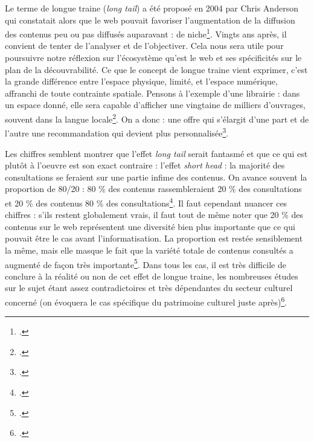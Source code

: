 Le terme de longue traine (\textit{long tail}) a été proposé en 2004 par Chris Anderson qui constatait alors que le web pouvait favoriser l’augmentation de la diffusion des contenus peu ou pas diffusés auparavant : de niche\footcite[§ 8]{benghozi_longue_2008}. Vingts ans après, il convient de tenter de l’analyser et de l’objectiver. Cela nous sera utile pour poursuivre notre réflexion sur l’écosystème qu’est le web et ses spécificités sur le plan de la découvrabilité. Ce que le concept de longue traine vient exprimer, c’est la grande différence entre l’espace physique, limité, et l’espace numérique, affranchi de toute contrainte spatiale. Pensons à l’exemple d’une librairie : dans un espace donné, elle sera capable d’afficher une vingtaine de milliers d’ouvrages, souvent dans la langue locale\footcite[§ 11 et § 12]{benghozi_longue_2008}. On a donc : une offre qui s’élargit d’une part et de l’autre une recommandation qui devient plus personnalisée\footcite[§ 17]{bourreau2015a}.

Les chiffres semblent montrer que l’effet \textit{long tail} serait fantasmé et que ce qui est plutôt à l'oeuvre est son exact contraire : l’effet \textit{short head} : la majorité des consultations se feraient sur une partie infime des contenus. On avance souvent la proportion de 80/20 : 80 \% des contenus rassembleraient 20 \% des consultations et 20 \% des contenus 80 \% des consultations\footcite[§ 10]{bourreau2015a}. Il faut cependant nuancer ces chiffres : s’ils restent globalement vrais, il faut tout de même noter que 20 \% des contenus sur le web représentent une diversité bien plus importante que ce qui pouvait être le cas avant l’informatisation. La proportion est restée sensiblement la même, mais elle masque le fait que la variété totale de contenus consultés a augmenté de façon très importante\footcite[§ 15]{bourreau2015a}. Dans tous les cas, il est très difficile de conclure à la réalité ou non de cet effet de longue traine, les nombreuses études sur le sujet étant assez contradictoires et très dépendantes du secteur culturel concerné (on évoquera le cas spécifique du patrimoine culturel juste après)\footcite[tableau 1]{bourreau2015a}.

